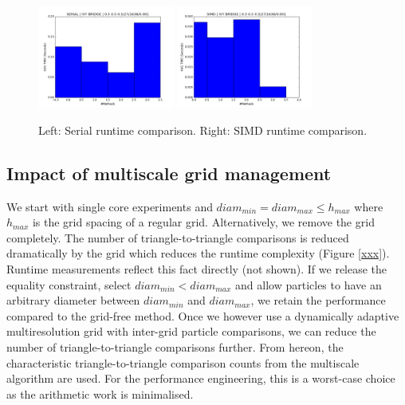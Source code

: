 \begin{figure}
  \begin{center}
    \includegraphics[width=0.4\textwidth]{experiments/vectorisation/plots/serial.png}
    \hspace{0.2cm}
    \includegraphics[width=0.4\textwidth]{experiments/vectorisation/plots/simd.png}
  \end{center}
  \caption{
    Left: Serial runtime comparison.
    Right: SIMD runtime comparison.
  }
  \label{figure:particle_hull}
\end{figure}

\clearpage

\subsection{Impact of multiscale grid management}

We start with single core experiments and $diam_{min} = diam_{max} \leq
h_{max}$ where $h_{max}$ is the grid spacing of a regular grid.
Alternatively, we remove the grid completely.
The number of triangle-to-triangle comparisons is reduced dramatically by the
grid which reduces the runtime complexity (Figure \ref{xxx}).
Runtime measurements reflect this fact directly (not shown).
If we release the equality constraint, select $diam_{min} < diam_{max}$ and
allow particles to have an arbitrary diameter between $diam_{min}$ and
$diam_{max}$, we retain the performance compared to the grid-free method.
Once we however use a dynamically adaptive multiresolution grid with inter-grid
particle comparisons, we can reduce the number of triangle-to-triangle
comparisons further. 
From hereon, the characteristic triangle-to-triangle comparison counts from the
multiscale algorithm are used.
For the performance engineering, this is a worst-case choice as the arithmetic
work is minimalised.

